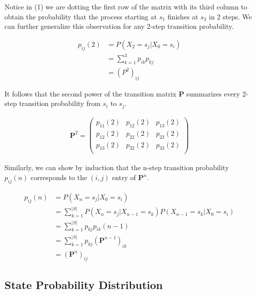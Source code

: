\documentclass[a4paper, 12pt]{article}
\begin{document}
	Notice in (1) we are dotting the first row of the matrix  with its third column to obtain the probability 
	that the process starting at $s_1$ finishes at $s_3$ in 2 steps. We can further generalize this observation for any 2-step 
	transition probability.

	\begin{equation*}
		\begin{aligned}
			p_{ij}(2) &= P(X_2 = s_j|X_0 = s_i) \\ 
					&= \sum_{k=1}^{3} p_{ik}p_{kj}\\
					&= (P^2)_{ij}
		\end{aligned}
	\end{equation*}	    

	It follows that the second power of the transition matrix \textbf{P} summarizes every 2-step transition probability 
	from $s_i$ to $s_j$.

	\begin{equation*}
		\begin{aligned}
			\mathbf{P}^2 =
			\begin{pmatrix}
				p_{11}(2) & p_{12}(2) & p_{13}(2) \\
				p_{12}(2) & p_{22}(2) & p_{23}(2) \\
				p_{13}(2) & p_{32}(2) & p_{33}(2) \\
			\end{pmatrix}
		\end{aligned}
	\end{equation*}

	Similarly, we can show by induction that the n-step transition probability $p_{ij}(n)$ corresponds to the $(i,j)$ entry 
	of $\mathbf{P}^n$. 
	
	\begin{equation*}
		\begin{aligned}
			p_{ij}(n) &= P(X_n = s_j|X_0 = s_i) \\
					&= \sum_{k=1}^{|S|} P(X_n = s_j|X_{n-1} = s_k)P(X_{n-1} = s_k | X_0 = s_i) \\
					&= \sum_{k=1}^{|S|} p_{kj}p_{ik}(n-1) \\
					&= \sum_{k=1}^{|S|} p_{kj}(\mathbf{P}^{n-1})_{ik} \\
					&= (\mathbf{P}^n)_{ij}
		\end{aligned}
	\end{equation*}	
	
\subsection*{State Probability Distribution}
\end{document}
